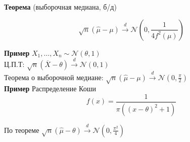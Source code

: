 \documentclass{article}
\begin{document}
\textbf{Теорема} (выборочная медиана, б/д) 

$$ \sqrt{n}(\hat{\mu} - \mu) \xrightarrow{d} \mathcal{N}(0, \frac{1}{4f^2(\mu)}) $$

\textbf{Пример} $X_1,\dots,X_n \sim \mathcal{N}(\theta, 1)$\\
Ц.П.Т: $\sqrt{n}(\overline{X} - \theta) \xrightarrow{d} \mathcal{N}(0,1)$\\
Теорема о выборочной медиане:  $ \sqrt{n}(\hat{\mu} - \mu) \xrightarrow{d} \mathcal{N}(0, \frac{\pi}{2}) $\\
\textbf{Пример} Распределение Коши
$$ f(x) = \frac{1}{\pi ((x - \theta)^2 + 1)} $$

По теореме $ \sqrt{n}(\hat{\mu}  - \theta) \xrightarrow{d} \mathcal{N}\left(0,\frac{\pi^2}{4}\right)$
\end{document}
